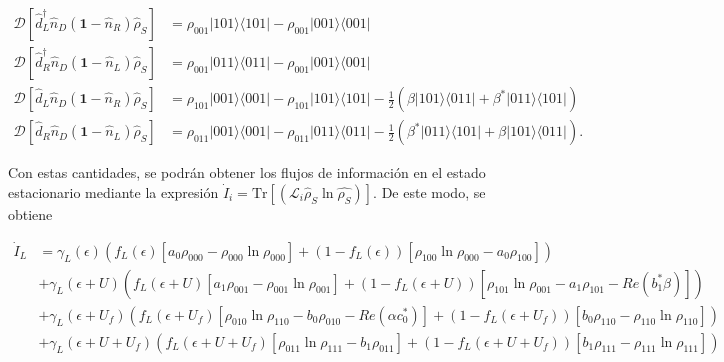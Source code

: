 \begin{appendixs}
\begin{align*}
    \mathcal{D}[\hat{d}^{\dagger}_{L}\hat{n}_{D}(\textbf{1}-\hat{n}_{R})\hat{\rho}_{S}] & = \rho_{001}|101\rangle \langle 101| - \rho_{001}|001\rangle \langle 001| \\ 
    \mathcal{D}[\hat{d}^{\dagger}_{R}\hat{n}_{D}(\textbf{1}-\hat{n}_{L})\hat{\rho}_{S}] & = \rho_{001}|011\rangle \langle 011| - \rho_{001}|001\rangle \langle 001| \\  
    \mathcal{D}[\hat{d}_{L}\hat{n}_{D}(\textbf{1}-\hat{n}_{R})\hat{\rho}_{S}] & = \rho_{101}|001\rangle \langle 001| - \rho_{101}|101\rangle \langle 101| - \frac{1}{2}(\beta |101\rangle \langle 011| + \beta^{*}|011\rangle \langle 101| ) \\ 
    \mathcal{D}[\hat{d}_{R}\hat{n}_{D}(\textbf{1}-\hat{n}_{L})\hat{\rho}_{S}] & = \rho_{011}|001\rangle \langle 001| - \rho_{011}|011\rangle \langle 011| - \frac{1}{2}(\beta^{*} |011\rangle \langle 101| + \beta|101\rangle \langle 011|  ).   
\end{align*}

Con estas cantidades, se podrán obtener los flujos de información en el estado estacionario mediante la expresión $\dot{I}_{i} = \text{Tr}[(\mathcal{L}_{i}\hat{\rho}_{S} \ln \hat{\rho_{S}}) ]$. De este modo, se obtiene 

\begin{align*}
    \dot{I}_{L} &  =  \gamma_{L}(\epsilon)(f_{L}(\epsilon)[a_{0}\rho_{000} - \rho_{000}\ln \rho_{000}] + (1-f_{L}(\epsilon))[\rho_{100}\ln \rho_{000} - a_{0}\rho_{100} ] )  \\ 
      & + \gamma_{L}(\epsilon + U)(f_{L}(\epsilon + U)[a_{1}\rho_{001} - \rho_{001}\ln \rho_{001}] + (1-f_{L}(\epsilon + U))[\rho_{101}\ln \rho_{001} -a_{1}\rho_{101} - Re(b^{*}_{1}\beta ) ]   ) \\  
      & + \gamma_{L}(\epsilon + U_{f})( f_{L}(\epsilon + U_{f})[\rho_{010}\ln \rho_{110} -b_{0}\rho_{010} - Re(\alpha c^{*}_{0}) ]  + (1-f_{L}(\epsilon + U_{f}))[b_{0}\rho_{110} - \rho_{110}\ln \rho_{110} ] ) \\  
      & + \gamma_{L}(\epsilon + U + U_{f})( f_{L}(\epsilon + U + U_{f})[\rho_{011}\ln \rho_{111}- b_{1}\rho_{011}] + (1-f_{L}(\epsilon+U+U_{f}) )[b_{1}\rho_{111} - \rho_{111}\ln \rho_{111}]  ) 
\end{align*}


\end{appendixs}
